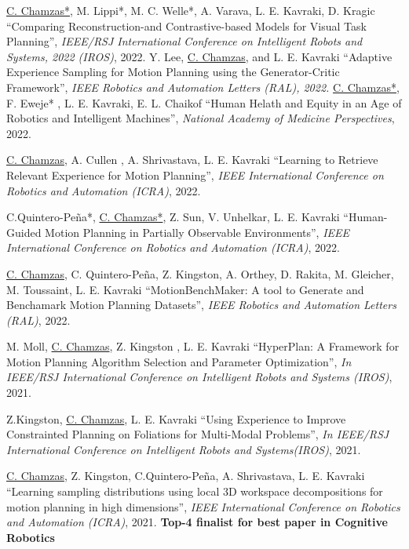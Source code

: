 \documentclass[letterpaper,11pt]{article}
\begin{document}
\begin{thebibliography}{14}
	\underline{C. Chamzas*}, M. Lippi*, M. C. Welle*, A. Varava, L. E. Kavraki, D. Kragic 
	``Comparing Reconstruction-and Contrastive-based Models for Visual Task Planning'',
	\textit{IEEE/RSJ International Conference on Intelligent Robots and Systems, 2022 (IROS)}, 2022.
	 Y. Lee, \underline{C. Chamzas}, and L. E. Kavraki 
	``Adaptive Experience Sampling for Motion Planning using the Generator-Critic Framework'',
	\textit{IEEE Robotics and Automation Letters (RAL), 2022.}
     \underline{C. Chamzas*}, F. Eweje* , L. E. Kavraki, E. L. Chaikof 
	``Human Helath and Equity in an Age of Robotics and Intelligent Machines'',
    \textit{National Academy of Medicine Perspectives}, 2022.

     \underline{C. Chamzas}, A. Cullen , A. Shrivastava, L. E. Kavraki
	``Learning to Retrieve Relevant Experience for Motion Planning'',
    \textit{IEEE International Conference on Robotics and Automation (ICRA)}, 2022.

     C.Quintero-Peña*, \underline{C. Chamzas*}, Z. Sun, V. Unhelkar, L. E. Kavraki
	``Human-Guided Motion Planning in Partially Observable Environments'',
    \textit{IEEE International Conference on Robotics and Automation (ICRA)}, 2022.

     \underline{C. Chamzas}, C. Quintero-Peña, Z. Kingston, A. Orthey, D. Rakita, M. Gleicher, M. Toussaint, L. E. Kavraki      ``MotionBenchMaker: A tool to Generate and Benchamark Motion Planning Datasets'',
     \textit{IEEE Robotics and Automation Letters (RAL)}, 2022.  

     M. Moll, \underline{C. Chamzas}, Z. Kingston , L. E. Kavraki
     ``HyperPlan: A Framework for Motion Planning Algorithm Selection and Parameter Optimization'',
     \textit{In IEEE/RSJ International Conference on Intelligent Robots and Systems (IROS)}, 2021.  

     Z.Kingston, \underline{C. Chamzas}, L. E. Kavraki
     ``Using Experience to Improve Constrainted Planning on Foliations for Multi-Modal Problems'',
     \textit{In IEEE/RSJ International Conference on Intelligent Robots and Systems(IROS)}, 2021.  

    \underline{C. Chamzas}, Z. Kingston, C.Quintero-Peña, A. Shrivastava, L. E. Kavraki
	``Learning sampling distributions using local 3D workspace decompositions for motion planning in high dimensions'',
    \textit{IEEE International Conference on Robotics and Automation (ICRA)}, 2021.
    \textbf{Top-4 finalist for best paper in Cognitive Robotics} 


\end{thebibliography}
\end{document}
